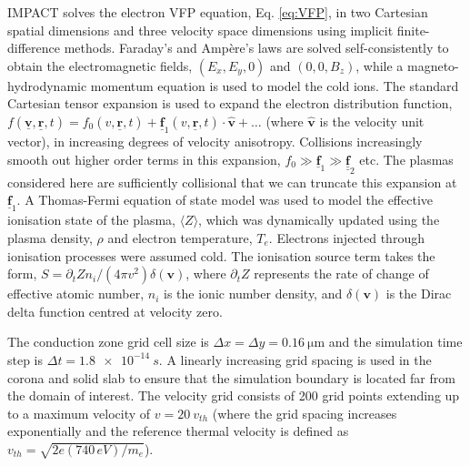 \documentclass[aip,reprint]{revtex4-1}
\newcommand*{\dbul}[1]{%
	\underline{\underline{ #1}}
}
\newcommand*{\myvec}[1]{
	\mathbf{\underline{#1}}}
\begin{document}
 IMPACT solves the electron VFP equation, Eq. \ref{eq:VFP}, in two Cartesian spatial dimensions and three velocity space dimensions using implicit finite-difference methods. Faraday's  and Amp\`ere's laws are solved self-consistently to obtain the electromagnetic fields, $(E_x, E_y,0)$ and $(0,0,B_z)$, while a magneto-hydrodynamic momentum equation is used to model the cold ions. The standard Cartesian tensor expansion \cite{Shkarovsky1966} is used  to expand the electron distribution function, $f(\myvec{v},\myvec{r},t) = f_0(v,\myvec{r},t) + \myvec{f}_1(v,\myvec{r},t) \cdot \hat{\mathbf{v}} + \dots$ (where $\hat{\mathbf{v}}$ is the velocity unit vector), in increasing degrees of velocity anisotropy. Collisions increasingly smooth out higher order terms in this expansion, $f_0 \gg \myvec{f}_1 \gg \dbul{\mathbf{f}}_2$ etc. The plasmas considered here are sufficiently collisional that we can truncate this expansion at $\mathbf{\myvec{f}}_1$. 
%
A Thomas-Fermi equation of state model was used to model the effective ionisation state of the plasma, $\langle Z \rangle$, which was dynamically updated using the plasma density, $\rho$ and electron temperature, $T_e$. Electrons injected through ionisation processes were assumed cold. The ionisation source term takes the form, $S= \partial_t Z n_i/( 4\pi v^2) \delta (\mathbf{v})$, where $\partial_t Z$ represents the rate of change of effective atomic number, $n_i$ is the ionic number density, and $\delta(\mathbf{v}) $ is the Dirac delta function centred at velocity zero. 

 The conduction zone grid cell size is $\Delta x= \Delta y =  \SI{0.16}{\micro\meter}$ and the simulation time step is $\Delta t = \SI{1.8e-14}{s}$. A linearly increasing grid spacing is used in the corona and solid slab to ensure that the simulation boundary is located far from the domain of interest. The velocity grid consists of 200 grid points extending up to a maximum velocity of $v = \SI{20}{v_{th}}$ (where the grid spacing increases exponentially and the reference thermal velocity is defined as $\si{v_{th}} = \sqrt{2 e (740\,\si{eV})/m_e}$). 
\end{document}
